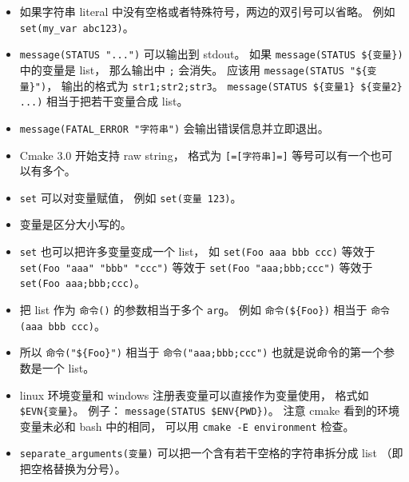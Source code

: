 \begin{itemize}
\item 如果字符串 literal 中没有空格或者特殊符号，两边的双引号可以省略。 例如 \verb|set(my_var abc123)|。
\item \verb`message(STATUS "...")` 可以输出到 stdout。 如果 \verb`message(STATUS ${变量})` 中的变量是 list， 那么输出中 \verb|;| 会消失。 应该用 \verb`message(STATUS "${变量}")`， 输出的格式为 \verb|str1;str2;str3|。 \verb`message(STATUS ${变量1} ${变量2} ...)` 相当于把若干变量合成 list。
\item \verb|message(FATAL_ERROR "字符串")| 会输出错误信息并立即退出。
\item Cmake 3.0 开始支持 raw string， 格式为 \verb|[=[字符串]=]| 等号可以有一个也可以有多个。
\item \verb`set` 可以对变量赋值， 例如 \verb`set(变量 123)`。
\item 变量是区分大小写的。
\item \verb`set` 也可以把许多变量变成一个 list， 如 \verb`set(Foo aaa bbb ccc)` 等效于 \verb|set(Foo "aaa" "bbb" "ccc")| 等效于 \verb|set(Foo "aaa;bbb;ccc")| 等效于 \verb|set(Foo aaa;bbb;ccc)|。
\item 把 list 作为 \verb|命令()| 的参数相当于多个 \verb|arg|。 例如 \verb`命令(${Foo})` 相当于 \verb`命令(aaa bbb ccc)`。
\item 所以 \verb`命令("${Foo}")` 相当于 \verb`命令("aaa;bbb;ccc")` 也就是说命令的第一个参数是一个 list。
\item linux 环境变量和 windows 注册表变量可以直接作为变量使用， 格式如 \verb`$EVN{变量}`。 例子： \verb|message(STATUS $ENV{PWD})|。 注意 cmake 看到的环境变量未必和 bash 中的相同， 可以用 \verb`cmake -E environment` 检查。
\item \verb|separate_arguments(变量)| 可以把一个含有若干空格的字符串拆分成 list （即把空格替换为分号）。
\end{itemize}

